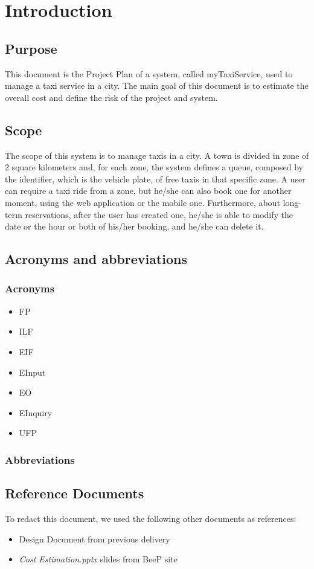 \section{Introduction}
\subsection{Purpose}
	This document is the Project Plan of a system, called myTaxiService, used to manage  a taxi service in a city. The main goal of this document is to estimate the overall cost and define the risk of the project and system.
\subsection{Scope}
	The scope of this system is to manage taxis in a city. A town is divided in zone of 2 square kilometers and, for each zone, the system defines a queue, composed by the identifier, which is the vehicle plate, of free taxis in that specific zone. A user can require a taxi ride from a zone, but he/she can also book one for another moment, using the web application or the mobile one. Furthermore, about long-term reservations, after the user has created one, he/she is able to modify the date or the hour or both of his/her booking, and he/she can delete it. 
\subsection{Acronyms and abbreviations}
	\subsubsection{Acronyms}
		\begin{itemize}
			\item FP
			\item ILF
			\item EIF
			\item EInput
			\item EO
			\item EInquiry
			\item UFP
		\end{itemize}
	\subsubsection{Abbreviations}
\subsection{Reference Documents}
	To redact this document, we used the following other documents as references:
	\begin{itemize}
		\item Design Document from previous delivery
		\item \emph{Cost Estimation.pptx} slides from BeeP site
	\end{itemize}